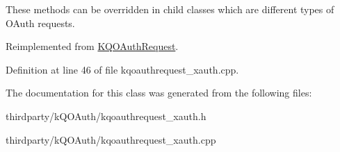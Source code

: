 These methods can be overridden in child classes which are different types of O\+Auth requests. 

Reimplemented from \hyperlink{class_k_q_o_auth_request_a6a9de60901bae594ecbd3a95a5967ed9}{K\+Q\+O\+Auth\+Request}.



Definition at line 46 of file kqoauthrequest\+\_\+xauth.\+cpp.



The documentation for this class was generated from the following files\+:\begin{DoxyCompactItemize}
\item 
thirdparty/k\+Q\+O\+Auth/kqoauthrequest\+\_\+xauth.\+h\item 
thirdparty/k\+Q\+O\+Auth/kqoauthrequest\+\_\+xauth.\+cpp\end{DoxyCompactItemize}
